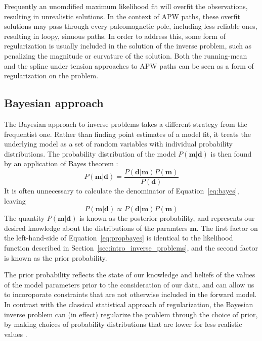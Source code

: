 \documentclass[preprint,12pt,authoryear]{elsarticle}
\begin{document}
Frequently an unomdified maximum likelihood fit will overfit the observations, resulting
in unrealistic solutions. In the context of APW paths, these overfit solutions may
pass through every paleomagnetic pole, including less reliable ones, resulting in
loopy, sinuous paths. In order to address this, some form of regularization is usually
included in the solution of the inverse problem, such as penalizing the magnitude or
curvature of the solution. Both the running-mean and the spline under tension approaches
to APW paths can be seen as a form of regularization on the problem.

\subsection{Bayesian approach}

The Bayesian approach to inverse problems takes a different strategy from the frequentist one.
Rather than finding point estimates of a model fit, it treats the underlying model
as a set of random variables with individual probability distributions.
The probability distribution of the model $P(\mathbf{m} \vert \mathbf{d})$ 
is then found by an application of Bayes theorem \citep[cf.][]{sivia2006data}:
\begin{equation}
P\left(\mathbf{m} \vert \mathbf{d} \right) = \frac{ P \left(\mathbf{d}\vert \mathbf{m} \right) P \left( \mathbf{m} \right) }{P \left( \mathbf{d}\right)}
\label{eq:bayes}
\end{equation}
It is often unnecessary to calculate the denominator of Equation~\eqref{eq:bayes}, leaving
\begin{equation}
P\left(\mathbf{m} \vert \mathbf{d} \right) \propto P \left( \mathbf{d} \vert \mathbf{m} \right) P \left( \mathbf{m} \right) 
\label{eq:propbayes}
\end{equation}
The quantity $P(\mathbf{m} \vert \mathbf{d})$ is known as the posterior probability,
and represents our desired knowledge about the distributions of the paramters $\mathbf{m}$.
The first factor on the left-hand-side of Equation~\eqref{eq:propbayes} is identical to the likelihood
function described in Section~\ref{sec:intro_inverse_problems}, and the second factor
is known as the prior probability.

The prior probability reflects the state of our knowledge and beliefs of the values
of the model parameters prior to the consideration of our data, and can allow us
to incoroporate constraints that are not otherwise included in the forward model.
In contrast with the classical statistical approach of regularization, the Bayesian
inverse problem can (in effect) regularize the problem through the choice of prior, by making
choices of probability distributions that are lower for less realistic values 
\citep{minson2013bayesian, sambridge2013transdimensional}.
\end{document}
